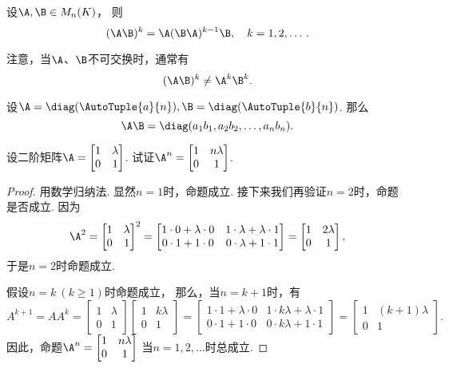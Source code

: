 \begin{proposition}
设\(\A,\B \in M_n(K)\)，
则\begin{equation}
	(\A\B)^k = \A(\B\A)^{k-1}\B,
	\quad k=1,2,\dotsc.
\end{equation}
\end{proposition}
\begin{remark}
注意，当\(\A\)、\(\B\)不可交换时，通常有\[
	(\A\B)^k \neq \A^k\B^k.
\]
\end{remark}

\begin{example}
设\(\A=\diag(\AutoTuple{a}{n}),
\B=\diag(\AutoTuple{b}{n})\).
那么\[
	\A\B = \diag(a_1b_1,a_2b_2,\dotsc,a_nb_n).
\]
\end{example}

\begin{example}
设二阶矩阵\(\A=\begin{bmatrix} 1 & \lambda \\ 0 & 1 \end{bmatrix}\).
试证\(\A^n=\begin{bmatrix} 1 & n\lambda \\ 0 & 1 \end{bmatrix}\).
\begin{proof}
用数学归纳法.
显然\(n=1\)时，命题成立.
接下来我们再验证\(n=2\)时，命题是否成立.
因为\[
	\A^2
	= \begin{bmatrix}
		1 & \lambda \\
		0 & 1
	\end{bmatrix}^2
	= \begin{bmatrix}
		1\cdot0+\lambda\cdot0 & 1\cdot\lambda+\lambda\cdot1 \\
		0\cdot1+1\cdot0 & 0\cdot\lambda+1\cdot1
	\end{bmatrix}
	= \begin{bmatrix}
		1 & 2\lambda \\
		0 & 1
	\end{bmatrix},
\]
于是\(n=2\)时命题成立.

假设\(n=k\ (k\geq1)\)时命题成立，
那么，当\(n=k+1\)时，有\[
	A^{k+1}
	= A A^k
	= \begin{bmatrix}
		1 & \lambda \\
		0 & 1
	\end{bmatrix}
	\begin{bmatrix}
		1 & k\lambda \\
		0 & 1
	\end{bmatrix}
	= \begin{bmatrix}
		1\cdot1+\lambda\cdot0 & 1\cdot k\lambda+\lambda\cdot1 \\
		0\cdot1+1\cdot0 & 0\cdot k\lambda+1\cdot1
	\end{bmatrix}
	= \begin{bmatrix}
		1 & (k+1)\lambda \\
		0 & 1
	\end{bmatrix}.
\]
因此，命题\(\A^n=\begin{bmatrix} 1 & n\lambda \\ 0 & 1 \end{bmatrix}\)
当\(n=1,2,\dotsc\)时总成立.
\end{proof}
\end{example}

